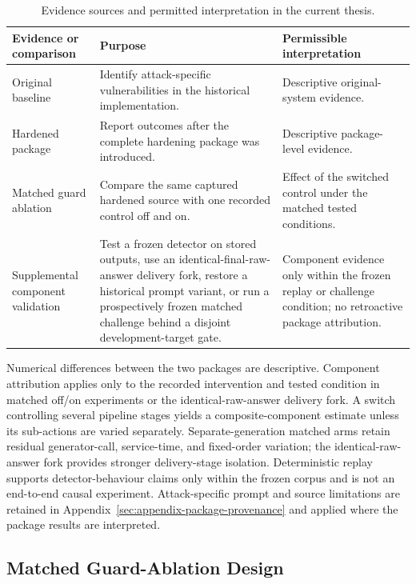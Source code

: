 \begin{table}[htbp]
\centering
\caption[Evidence sources and interpretation]{Evidence sources and permitted interpretation in the current thesis.}
\label{tab:evidence-provenance}
\begin{tabularx}{\textwidth}{>{\raggedright\arraybackslash}p{}X>{\raggedright\arraybackslash}p{}}
\toprule
Evidence or comparison & Purpose & Permissible interpretation \\
\midrule
Original baseline & Identify attack-specific vulnerabilities in the historical implementation. & Descriptive original-system evidence. \\
Hardened package & Report outcomes after the complete hardening package was introduced. & Descriptive package-level evidence. \\
Matched guard ablation & Compare the same captured hardened source with one recorded control off and on. & Effect of the switched control under the matched tested conditions. \\
Supplemental component validation & Test a frozen detector on stored outputs, use an identical-final-raw-answer delivery fork, restore a historical prompt variant, or run a prospectively frozen matched challenge behind a disjoint development-target gate. & Component evidence only within the frozen replay or challenge condition; no retroactive package attribution. \\
\bottomrule
\end{tabularx}
\end{table}

\noindent Numerical differences between the two packages are descriptive. Component attribution applies only to the recorded intervention and tested condition in matched off/on experiments or the identical-raw-answer delivery fork. A switch controlling several pipeline stages yields a composite-component estimate unless its sub-actions are varied separately. Separate-generation matched arms retain residual generator-call, service-time, and fixed-order variation; the identical-raw-answer fork provides stronger delivery-stage isolation. Deterministic replay supports detector-behaviour claims only within the frozen corpus and is not an end-to-end causal experiment. Attack-specific prompt and source limitations are retained in Appendix~\ref{sec:appendix-package-provenance} and applied where the package results are interpreted.

\subsection{Matched Guard-Ablation Design}
\label{sec:matched-ablation-design}

